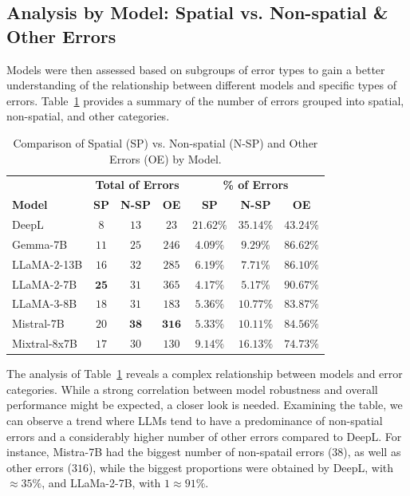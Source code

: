 \subsection{Analysis by Model: Spatial vs. Non-spatial \& Other Errors}

Models were then assessed based on subgroups of error types to gain a better understanding of the relationship between different models and specific types of errors. Table~\ref{tab:model_performance_by_error_type} provides a summary of the number of errors grouped into spatial, non-spatial, and other categories.

\begin{table}[htb]
\centering
\begin{tabular}{lcccccc}
\toprule
& \multicolumn{3}{c}{\textbf{Total of Errors}} & \multicolumn{3}{c}{\textbf{\% of Errors}} \\
\cmidrule(lr){2-4} \cmidrule(lr){5-7}
\textbf{Model} & \textbf{SP} & \textbf{N-SP} & \textbf{OE} & \textbf{SP} & \textbf{N-SP} & \textbf{OE} \\
\midrule
DeepL & $8$ & $13$ & $23$ & $\mathbf{21.62\%}$ & $\mathbf{35.14}\%$ & $43.24\%$ \\
\midrule
Gemma-7B & $11$ & $25$ & $246$ & $4.09\%$ & $9.29\%$ & $86.62\%$ \\
LLaMA-2-13B & $16$ & $32$ & $285$ & $6.19\%$ & $7.71\%$ & $86.10\%$ \\
LLaMA-2-7B & $\mathbf{25}$ & $31$ & $365$ & $4.17\%$ & $5.17\%$ & $\mathbf{90.67\%}$ \\
LLaMA-3-8B & $18$ & $31$ & $183$ & $5.36\%$ & $10.77\%$ & $83.87\%$ \\
Mistral-7B & $20$ & $\mathbf{38}$ & $\mathbf{316}$ & $5.33\%$ & $10.11\%$ & $84.56\%$ \\
Mixtral-8x7B & $17$ & $30$ & $130$ & $\mathbf{9.14\%}$ & $\mathbf{16.13\%}$ & $74.73\%$ \\
\bottomrule
\end{tabular}
\caption{Comparison of Spatial (SP) vs. Non-spatial (N-SP) and Other Errors (OE) by Model.}
\label{tab:model_performance_by_error_type}
\end{table}

The analysis of Table~\ref{tab:model_performance_by_error_type} reveals a complex relationship between models and error categories. While a strong correlation between model robustness and overall performance might be expected, a closer look is needed. Examining the table, we can observe a trend where LLMs tend to have a predominance of non-spatial errors and a considerably higher number of other errors compared to DeepL. For instance, Mistra-7B had the biggest number of non-spatail errors ($38$), as well as other errors ($316$), while the biggest proportions were obtained by DeepL, with $\approx35\%$, and LLaMa-2-7B, with  $1\approx91\%$.

